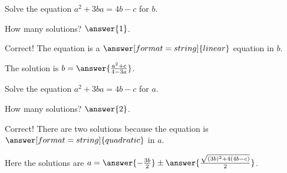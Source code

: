 \documentclass[nooutcomes]{ximera}
\begin{document}
\begin{problem}

Solve the equation $a^2+3ba = 4b - c$ for $b$. 

How many solutions? $\answer{1}$.

\begin{problem}
Correct!  The equation is a $\answer[format=string]{linear}$ equation in $b$.  

The solution is $b=\answer{\frac{a^2 + c}{4 - 3 a}}$.  
\end{problem}
\end{problem}


\begin{problem}
Solve the equation $a^2+3ba = 4b - c$ for $a$. 

How many solutions? $\answer{2}$.
\begin{problem}
Correct!  There are two solutions because the equation is $\answer[format=string]{quadratic}$ in $a$.  

Here the solutions are $a=\answer{-\frac{3b}{2}}\pm \answer{\frac{\sqrt{(3b)^2 + 4(4b-c)}}{2}}$.  
\end{problem}
\end{problem}
\end{document}
